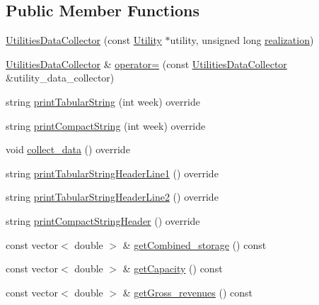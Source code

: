 \subsection*{Public Member Functions}
\begin{DoxyCompactItemize}
\item 
\mbox{\hyperlink{classUtilitiesDataCollector_a7aee55a1cbd0fcdca59339a9e78ed08b}{Utilities\+Data\+Collector}} (const \mbox{\hyperlink{classUtility}{Utility}} $\ast$utility, unsigned long \mbox{\hyperlink{classDataCollector_a9ef2887466fe3123aa19ef956a219b96}{realization}})
\item 
\mbox{\hyperlink{classUtilitiesDataCollector}{Utilities\+Data\+Collector}} \& \mbox{\hyperlink{classUtilitiesDataCollector_a805182c7f423290135a5c92844cdbb4a}{operator=}} (const \mbox{\hyperlink{classUtilitiesDataCollector}{Utilities\+Data\+Collector}} \&utility\+\_\+data\+\_\+collector)
\item 
string \mbox{\hyperlink{classUtilitiesDataCollector_a39e7d28a70a0f71b3f1cc28b19c7e2d9}{print\+Tabular\+String}} (int week) override
\item 
string \mbox{\hyperlink{classUtilitiesDataCollector_a57b5f9cd8ddf54154476749ab0977355}{print\+Compact\+String}} (int week) override
\item 
void \mbox{\hyperlink{classUtilitiesDataCollector_ab72c4432d6816beb1f4f4b354fb3023d}{collect\+\_\+data}} () override
\item 
string \mbox{\hyperlink{classUtilitiesDataCollector_a796aa9d7637d8ed04dbd949ca2a34088}{print\+Tabular\+String\+Header\+Line1}} () override
\item 
string \mbox{\hyperlink{classUtilitiesDataCollector_ae502a096e8f4fdfdfd481ab2093f9771}{print\+Tabular\+String\+Header\+Line2}} () override
\item 
string \mbox{\hyperlink{classUtilitiesDataCollector_ab3409c407783fd4451f310d2fc177b22}{print\+Compact\+String\+Header}} () override
\item 
const vector$<$ double $>$ \& \mbox{\hyperlink{classUtilitiesDataCollector_af8dbc15ad82c1209b9fc75b25321f408}{get\+Combined\+\_\+storage}} () const
\item 
const vector$<$ double $>$ \& \mbox{\hyperlink{classUtilitiesDataCollector_a60777cdd34af760348ca62d24b57be48}{get\+Capacity}} () const
\item 
const vector$<$ double $>$ \& \mbox{\hyperlink{classUtilitiesDataCollector_acdfb52a6c46cc891f48296565538966f}{get\+Gross\+\_\+revenues}} () const
\item 

\end{DoxyCompactItemize}
